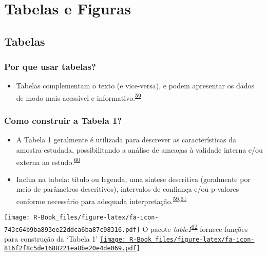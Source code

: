\documentclass[
]{book}
\providecommand{\tightlist}{%
  \setlength{\itemsep}{0pt}\setlength{\parskip}{0pt}}
\begin{document}
\hypertarget{tabelas-figuras}{%
\chapter{\texorpdfstring{\textbf{Tabelas e Figuras}}{Tabelas e Figuras}}\label{tabelas-figuras}}

\hypertarget{tabelas}{%
\section{Tabelas}\label{tabelas}}

\hypertarget{por-que-usar-tabelas}{%
\subsection{Por que usar tabelas?}\label{por-que-usar-tabelas}}

\begin{itemize}
\tightlist
\item
  Tabelas complementam o texto (e vice-versa), e podem apresentar os dados de modo mais acessível e informativo.\textsuperscript{\protect\hyperlink{ref-Inskip2017}{59}}
\end{itemize}

\hypertarget{como-construir-a-tabela-1}{%
\subsection{Como construir a Tabela 1?}\label{como-construir-a-tabela-1}}

\begin{itemize}
\item
  A Tabela 1 geralmente é utilizada para descrever as características da amostra estudada, possibilitando a análise de ameaças à validade interna e/ou externa ao estudo.\textsuperscript{\protect\hyperlink{ref-Hayes-Larson2019}{60}}
\item
  Inclua na tabela: título ou legenda, uma síntese descritiva (geralmente por meio de parâmetros descritivos), intervalos de confiança e/ou p-valores conforme necessário para adequada interpretação.\textsuperscript{\protect\hyperlink{ref-Inskip2017}{59},\protect\hyperlink{ref-Kwak2021}{61}}
\end{itemize}

\texttt{[image: R-Book\_files/figure-latex/fa-icon-743c64b9ba893ee22ddca6ba87c98316.pdf]} O pacote \emph{table1}\textsuperscript{\protect\hyperlink{ref-table1}{62}} fornece funções para construção da `Tabela 1' \href{https://cran.r-project.org/web/packages/table1/index.html}{\texttt{[image: R-Book\_files/figure-latex/fa-icon-816f2f8c5de1688221ea8be20e4de069.pdf]}}
\end{document}
